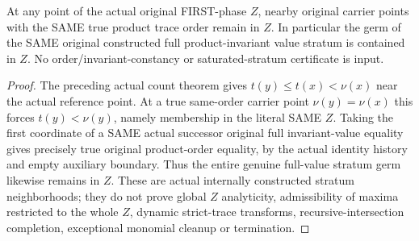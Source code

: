 \begin{theorem}
\label{hir:sharp-original-distinct-defect-actual-order-invariant-strata-saturated}
\leanok
At any point of the actual original FIRST-phase $Z$, nearby original carrier
points with the SAME true product trace order remain in $Z$. In particular the
germ of the SAME original constructed full product-invariant value stratum
is contained in $Z$. No order/invariant-constancy or saturated-stratum
certificate is input.
\end{theorem}
\begin{proof}
The preceding actual count theorem gives $t(y)\leq t(x)<\nu(x)$ near the actual
reference point. At a true same-order carrier point $\nu(y)=\nu(x)$ this forces
$t(y)<\nu(y)$, namely membership in the literal SAME $Z$. Taking the first
coordinate of a SAME actual successor original full invariant-value equality
gives precisely true original product-order equality, by the actual identity
history and empty auxiliary boundary. Thus the entire genuine full-value
stratum germ likewise remains in $Z$. These are actual internally constructed
stratum neighborhoods; they do not prove global $Z$ analyticity, admissibility
of maxima restricted to the whole $Z$, dynamic strict-trace transforms,
recursive-intersection completion, exceptional monomial cleanup or termination.
\end{proof}
